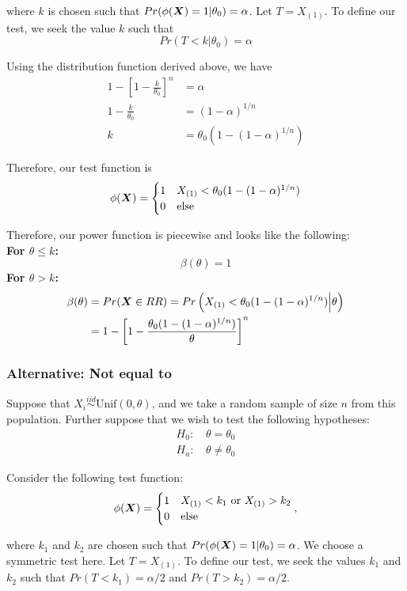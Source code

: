\documentclass[]{article}
\newcommand{\bfX}{\mbox{\boldmath $X$}}
\begin{document}
where $k$ is chosen such that $Pr(\phi(\bfX) = 1|\theta_0) = \alpha$. Let $T = X_{(1)}$. To define our test, we seek the value $k$ such that 
\[
Pr(T < k | \theta_0) = \alpha
\]

Using the distribution function derived above, we have
\[
\begin{split}
1 - \left[1 - \frac{k}{\theta_0}\right]^n &= \alpha \\
1 - \frac{k}{\theta_0} &= (1 - \alpha)^{1/n} \\
k &= \theta_0(1 - (1 - \alpha)^{1/n})
\end{split}
\]

Therefore, our test function is
\[
\phi(\bfX) = \begin{cases}
1 & X_{(1)} < \theta_0(1 - (1 - \alpha)^{1/n}) \\
0 & \text{else}
\end{cases}
\]

Therefore, our power function is piecewise and looks like the following:\\
\textbf{For $\theta \leq k$:}
\[
\beta(\theta) = 1
\]
\textbf{For $\theta > k$:}
\[
\begin{split}
\beta(\theta) &= Pr(\bfX \in RR) = Pr\left(X_{(1)} < \theta_0(1 - (1 - \alpha)^{1/n}) \Big| \theta\right) \\
&= 1 - \left[1 - \frac{\theta_0(1 - (1 - \alpha)^{1/n})}{\theta}\right]^n
\end{split}
\]

\subsubsection{Alternative: Not equal to}

Suppose that $X_i \stackrel{iid}{\sim} \text{Unif}(0, \theta)$, and we take a random sample of size $n$ from this population. Further suppose that we wish to test the following hypotheses:
\[
\begin{split}
\text{$H_0$: }& \theta = \theta_0 \\
\text{$H_a$: }& \theta \neq \theta_0
\end{split}
\]

Consider the following test function:
\[
\phi(\bfX) = \begin{cases}
1 & X_{(1)} < k_1 \text{ or } X_{(1)} > k_2 \\
0 & \text{else}
\end{cases},
\]

where $k_1$ and $k_2$ are chosen such that $Pr(\phi(\bfX) = 1|\theta_0) = \alpha$. We choose a symmetric test here. Let $T = X_{(1)}$. To define our test, we seek the values $k_1$ and $k_2$ such that $Pr(T < k_1) = \alpha/2$ and $Pr(T > k_2) = \alpha/2$.
\end{document}
